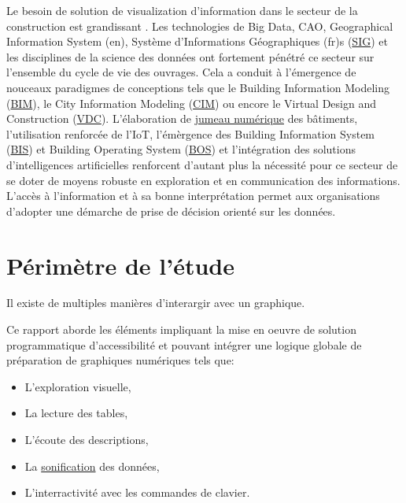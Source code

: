 \documentclass[a4paper,12pt]{article}
\begin{document}
\begin{multicols}{2}
Le besoin de solution de visualization d'information dans le secteur de la construction est  grandissant \autocite{ref?}. Les technologies de Big Data, CAO, Geographical Information System (en), Système d'Informations Géographiques (fr)s (\protect\hyperlink{gls-1}{\label{gls-1-use-1}SIG}) et les disciplines de la science des données ont fortement pénétré ce secteur sur l'ensemble du cycle de vie des ouvrages. Cela a conduit à l'émergence de nouceaux paradigmes de conceptions tels que le Building Information Modeling
 (\protect\hyperlink{gls-2}{\label{gls-2-use-1}BIM}), le City Information Modeling
 (\protect\hyperlink{gls-3}{\label{gls-3-use-1}CIM}) ou encore le Virtual Design and Construction
 (\protect\hyperlink{gls-4}{\label{gls-4-use-1}VDC}). \autocite{asiauniversitytaichungtaiwanResearchApplicationFunctiontechnologyaesthetics2020} L'élaboration de \protect\hyperlink{gls-5}{\label{gls-5-use-1}jumeau numérique} des bâtiments, l'utilisation renforcée de l'IoT, l'émèrgence des Building Information System
 (\protect\hyperlink{gls-6}{\label{gls-6-use-1}BIS}) et Building Operating System
 (\protect\hyperlink{gls-7}{\label{gls-7-use-1}BOS}) et l'intégration des solutions d'intelligences artificielles renforcent d'autant plus la nécessité pour ce secteur de se doter de moyens robuste en exploration et en communication des informations.
L'accès à l'information et à sa bonne interprétation permet aux organisations d'adopter une démarche de prise de décision orienté sur les données. \autocite{sosulskiDataVisualizationMade2019}  
\section{Périmètre de l'étude}
\label{sec:orgb338446}
Il existe de multiples manières d'interargir avec un graphique. \autocite{schwabishCenteringAccessibilityData2022a,frankelavskyRightToolsJob2022}

Ce rapport aborde les éléments impliquant la mise en oeuvre de solution programmatique d'accessibilité et pouvant intégrer une logique globale de préparation de graphiques numériques tels que:
\begin{itemize}
\item L'exploration visuelle,
\item La lecture des tables,
\item L'écoute des descriptions,
\item La \protect\hyperlink{gls-8}{\label{gls-8-use-1}sonification} des données,
\item L'interractivité avec les commandes de clavier.
\end{itemize}


\end{multicols}
\end{document}
